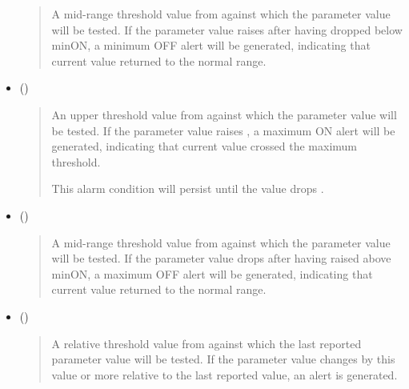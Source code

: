 \documentclass[letterpaper,10pt,english]{sphinxmanual}
\begin{document}
\begin{itemize}
\begin{quote}
A mid-range threshold value from  against which the parameter value will be tested.
If the parameter value raises  after having dropped below minON, a minimum OFF alert {\hyperref[\detokenize{otaapi:paramalertoff}]{}} will be generated, indicating that current value returned to the normal range.
\end{quote}

\item {} 
 ()
\begin{quote}

An upper threshold value from  against which the parameter value will be tested.
If the parameter value raises , a maximum ON alert {\hyperref[\detokenize{otaapi:paramalerton}]{}} will be generated, indicating that current value crossed the maximum threshold.

This alarm condition will persist until the value drops .
\end{quote}

\item {} 
 ()
\begin{quote}

A mid-range threshold value from  against which the parameter value will be tested.
If the parameter value drops  after having raised above minON, a maximum OFF alert {\hyperref[\detokenize{otaapi:paramalertoff}]{}} will be generated, indicating that current value returned to the normal range.
\end{quote}

\item {} 
 ()
\begin{quote}

A relative threshold value from  against which the last reported parameter value will be tested.
If the parameter value changes by this value or more relative to the last reported value, an alert is generated.
\end{quote}


\end{itemize}
\end{document}
